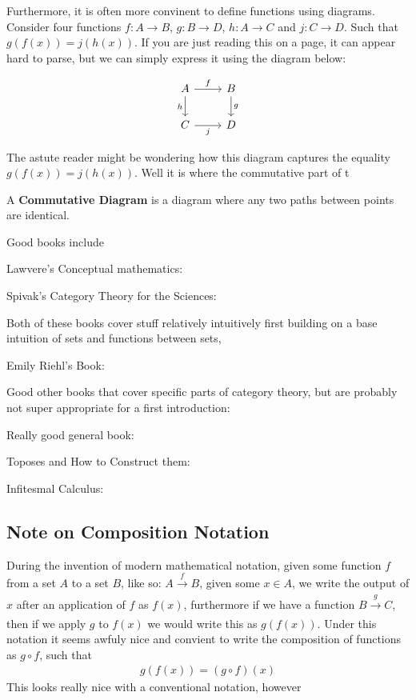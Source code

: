 Furthermore, it is often more convinent to define functions using diagrams. Consider four functions $f: A \rightarrow B$, $g: B \rightarrow D$, $h: A \rightarrow C$ and $j: C \rightarrow D$. Such that $g(f(x))=j(h(x))$. If you are just reading this on a page, it can appear hard to parse, but we can simply express it using the diagram below:

\[\begin{tikzcd}
	A & B \\
	C & D
	\arrow["f", from=1-1, to=1-2]
	\arrow["g", from=1-2, to=2-2]
	\arrow["h"', from=1-1, to=2-1]
	\arrow["j"', from=2-1, to=2-2]
\end{tikzcd}\]

The astute reader might be wondering how this diagram captures the equality $g(f(x))=j(h(x))$. Well it is where the commutative part of t

\begin{definition}
  A \textbf{Commutative Diagram} is a diagram where any two paths between points are identical. 
\end{definition}
Good books include

Lawvere's Conceptual mathematics: \cite{lawvere_conceptual_nodate} 

Spivak's Category Theory for the Sciences:
\cite{spivak_category_2014}

Both of these books cover stuff relatively intuitively first building on a base intuition of sets and functions between sets, 

Emily Riehl's Book: \cite{riehl_category_2016}

Good other books that cover specific parts of category theory, but are probably not super appropriate for a first introduction:

Really good general book: \cite{fong_invitation_2019}

Toposes and How to Construct them: \cite{johnstone_sketches_2002}


Infitesmal Calculus: \cite{bell_primer_2008} \cite{lavendhomme_basic_1996}

\subsection{Note on Composition Notation}

During the invention of modern mathematical notation, given some function $f$ from a set  $A$ to a set $B$, like so: $A \xrightarrow[]{f} B$, given some $x \in A$, we write the output of $x$ after an application of $f$ as $f(x)$, furthermore if we have a function $ B \xrightarrow[]{g}C$, then if we apply $g$ to $f(x)$ we would write this as $g(f(x))$. Under this notation it seems awfuly nice and convient to write the composition of functions as $g \circ f$, such that
\begin{align*}
    g(f(x)) = (g \circ f)(x)
\end{align*}
This looks really nice with a conventional notation, however

